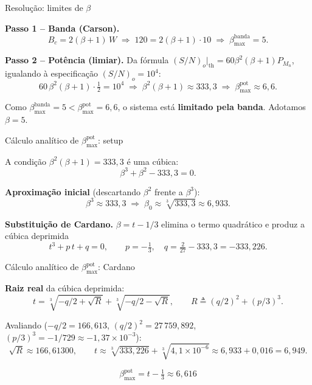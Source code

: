 
\begin{frame}{Resolução: limites de $\beta$}

\textbf{Passo 1 -- Banda (Carson).}
\[
B_c = 2(\beta + 1)\, W \;\Rightarrow\; 120 = 2(\beta+1)\cdot 10
\;\Rightarrow\; \beta_{\max}^{\text{banda}} = 5.
\]

\textbf{Passo 2 -- Potência (limiar).} Da fórmula $(S/N)_o|_{\text{th}} = 60\beta^2(\beta+1) P_{M_n}$, igualando à especificação $(S/N)_o = 10^4$:
\[
60\,\beta^2(\beta+1)\cdot \tfrac{1}{2} = 10^4
\;\Rightarrow\; \beta^2(\beta+1) \approx 333{,}3
\;\Rightarrow\; \beta_{\max}^{\text{pot}} \approx 6{,}6.
\]

Como $\beta_{\max}^{\text{banda}} = 5 < \beta_{\max}^{\text{pot}} = 6{,}6$, o sistema está \textbf{limitado pela banda}. Adotamos $\beta = 5$.

\end{frame}


\begin{frame}{Cálculo analítico de $\beta_{\max}^{\text{pot}}$: setup}

A condição $\beta^2(\beta+1) = 333{,}3$ é uma cúbica:
\[
\beta^3 + \beta^2 - 333{,}3 = 0.
\]

\textbf{Aproximação inicial} (descartando $\beta^2$ frente a $\beta^3$):
\[
\beta^3 \approx 333{,}3 \;\Rightarrow\; \beta_0 \approx \sqrt[3]{333{,}3} \approx 6{,}933.
\]

\textbf{Substituição de Cardano.} $\beta = t - 1/3$ elimina o termo quadrático e produz a cúbica deprimida
\[
t^3 + p\,t + q = 0, \qquad p = -\tfrac{1}{3}, \quad q = \tfrac{2}{27} - 333{,}3 = -333{,}226.
\]

\end{frame}


\begin{frame}{Cálculo analítico de $\beta_{\max}^{\text{pot}}$: Cardano}

\textbf{Raiz real} da cúbica deprimida:
\[
t = \sqrt[3]{-q/2 + \sqrt{R}} + \sqrt[3]{-q/2 - \sqrt{R}}, \qquad
R \triangleq (q/2)^2 + (p/3)^3.
\]

Avaliando ($-q/2 = 166{,}613$, $(q/2)^2 = 27\,759{,}892$, $(p/3)^3 = -1/729 \approx -1{,}37\times 10^{-3}$):
\[
\sqrt{R} \approx 166{,}61300, \qquad
t \approx \sqrt[3]{333{,}226} + \sqrt[3]{4{,}1\times 10^{-6}}
   \approx 6{,}933 + 0{,}016 = 6{,}949.
\]

\[
\boxed{\beta_{\max}^{\text{pot}} = t - \tfrac{1}{3} \approx 6{,}616}
\]

\end{frame}

